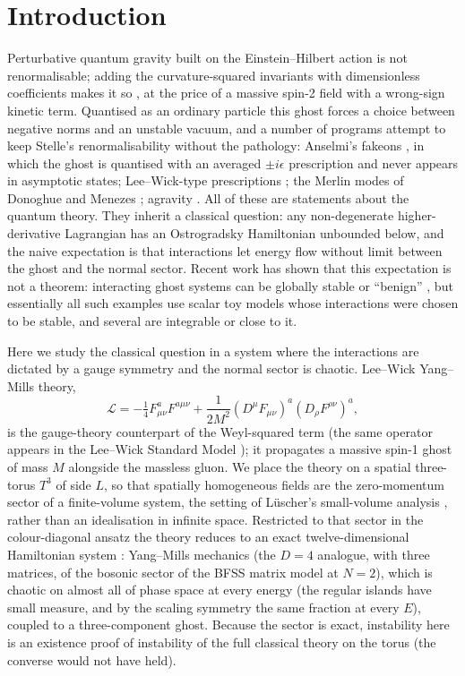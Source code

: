 \documentclass[11pt,a4paper]{article}
\begin{document}
\section{Introduction}

Perturbative quantum gravity built on the Einstein--Hilbert action is not renormalisable; adding
the curvature-squared invariants with dimensionless coefficients makes it so \cite{Stelle77}, at
the price of a massive spin-2 field with a wrong-sign kinetic term. Quantised as an ordinary
particle this ghost forces a choice between negative norms and an unstable vacuum, and a number of
programs attempt to keep Stelle's renormalisability without the pathology: Anselmi's fakeons
\cite{Anselmi17,Anselmi18}, in which the ghost is quantised with an averaged $\pm i\epsilon$
prescription and never appears in asymptotic states; Lee--Wick-type prescriptions
\cite{LeeWick,GOW08}; the Merlin modes of Donoghue and Menezes \cite{DonoghueMenezes}; agravity
\cite{SalvioStrumia}. All of these are statements about the quantum theory. They inherit a
classical question: any non-degenerate higher-derivative Lagrangian has an Ostrogradsky
Hamiltonian unbounded below, and the naive expectation is that interactions let energy flow
without limit between the ghost and the normal sector. Recent work has shown that this expectation
is not a theorem: interacting ghost systems can be globally stable or ``benign''
\cite{DMV22,DamourSmilga,Smilga}, but essentially all such examples use scalar toy models whose
interactions were chosen to be stable, and several are integrable or close to it.

Here we study the classical question in a system where the interactions are dictated by a gauge
symmetry and the normal sector is chaotic. Lee--Wick Yang--Mills theory,
\begin{equation}
\mathcal L=-\tfrac14F^a_{\mu\nu}F^{a\mu\nu}+\frac1{2M^2}(D^\mu F_{\mu\nu})^a(D_\rho F^{\rho\nu})^a,
\label{eq:LWYM}
\end{equation}
is the gauge-theory counterpart of the Weyl-squared term (the same operator appears in the
Lee--Wick Standard Model \cite{GOW08}); it propagates a massive spin-1 ghost of mass $M$ alongside
the massless gluon. We place the theory on a spatial three-torus $T^3$ of side $L$, so that
spatially homogeneous fields are the zero-momentum sector of a finite-volume system, the setting
of L\"uscher's small-volume analysis \cite{Luscher83}, rather than an idealisation in infinite
space. Restricted to that sector in the colour-diagonal ansatz the theory
reduces to an exact twelve-dimensional Hamiltonian system \cite{note:derive}: Yang--Mills
mechanics \cite{MatinyanSavvidy,Savvidy} (the $D=4$ analogue, with three matrices, of the
bosonic sector of the BFSS matrix model at $N=2$), which is chaotic on almost all of phase space at every
energy (the regular islands \cite{DahlqvistRussberg} have small measure, and by the scaling
symmetry the same fraction at every $E$), coupled to a three-component ghost. Because the sector is exact, instability here is an existence proof of
instability of the full classical theory on the torus (the converse would not have held).
\end{document}
